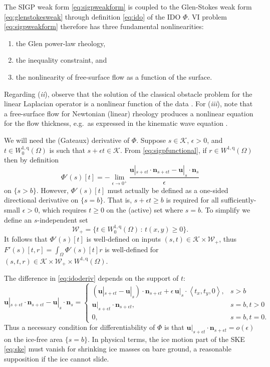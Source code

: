 \documentclass[letterpaper,final,12pt,reqno]{amsart}
\theoremstyle{claim}
\newcommand{\eps}{\epsilon}
\newcommand{\bn}{\mathbf{n}}
\newcommand{\bu}{\mathbf{u}}
\newcommand{\qq}{{\text{q}}}
\newcommand{\bus}{\bu|_s}
\numberwithin{equation}{section}
\numberwithin{figure}{section}
\numberwithin{table}{section}
\numberwithin{theorem}{section}
\begin{document}
The SIGP weak form \eqref{eq:sigpweakform} is coupled to the Glen-Stokes weak form \eqref{eq:glenstokesweak} through definition \eqref{eq:ido} of the IDO $\Phi$.  VI problem \eqref{eq:sigpweakform} therefore has three fundamental nonlinearities:
\renewcommand{\labelenumi}{(\emph{\roman{enumi}})}
\begin{enumerate}
\item the Glen power-law rheology,
\item the inequality constraint, and
\item the nonlinearity of free-surface flow as a function of the surface.
\end{enumerate}
Regarding (\emph{ii}), observe that the solution of the classical obstacle problem for the linear Laplacian operator is a nonlinear function of the data \cite{KinderlehrerStampacchia1980}.  For (\emph{iii}), note that a free-surface flow for Newtonian (linear) rheology produces a nonlinear equation for the flow thickness, e.g.~as expressed in the kinematic wave equation \cite{Ockendonetal2003}.

We will need the (Gateaux) derivative of $\Phi$.  Suppose $s\in \mathcal{K}$, $\eps>0$, and $t \in W_0^{1,\qq}(\Omega)$ is such that $s+\eps t \in \mathcal{K}$.  From \eqref{eq:sigpfunctional}, if $r\in W^{1,\qq}(\Omega)$ then by definition
\begin{equation}
\Phi'(s)[t] = - \lim_{\eps\to 0^+} \frac{\bu|_{s+\eps t} \cdot \bn_{s+\eps t} - \bus \cdot \bn_s}{\eps} \label{eq:idoderiv}
\end{equation}
on $\{s>b\}$.  However, $\Phi'(s)[t]$ must actually be defined as a one-sided directional derivative on $\{s=b\}$.  That is, $s+\eps t\ge b$ is required for all sufficiently-small $\eps>0$, which requires $t\ge 0$ on the (active) set where $s=b$.  To simplify we define an $s$-independent set
\begin{equation}
\mathcal{W}_+ = \{t \in W_0^{1,\qq}(\Omega) \,:\, t(x,y) \ge 0\}. \label{eq:infdefectset}
\end{equation}
It follows that $\Phi'(s)[t]$ is well-defined on inputs $(s,t) \in \mathcal{K} \times \mathcal{W}_+$, thus $F'(s)[t,r]=\int_\Omega \Phi'(s)[t] r$ is well-defined for $(s,t,r) \in \mathcal{K} \times \mathcal{W}_+ \times W^{1,\qq}(\Omega)$.

The difference in \eqref{eq:idoderiv} depends on the support of $t$:
\begin{equation}
\bu|_{s+\eps t} \cdot \bn_{s+\eps t} - \bus \cdot \bn_s = \begin{cases}
           (\bu|_{s+\eps t} - \bus) \cdot \bn_{s+\eps t} + \eps\, \bus \cdot \left<t_x,t_y,0\right>, & s > b \\
           \bu|_{s+\eps t} \cdot \bn_{s+\eps t}, & s=b, t > 0 \\
           0, & s=b, t = 0.
                 \end{cases} \label{eq:differencecases}
\end{equation}
Thus a necessary condition for differentiability of $\Phi$ is that $\bu|_{s+\eps t} \cdot \bn_{s+\eps t} = o(\eps)$ on the ice-free area $\{s=b\}$.  In physical terms, the ice motion part of the SKE \eqref{eq:ske} must vanish for shrinking ice masses on bare ground, a reasonable supposition if the ice cannot slide.
\end{document}
